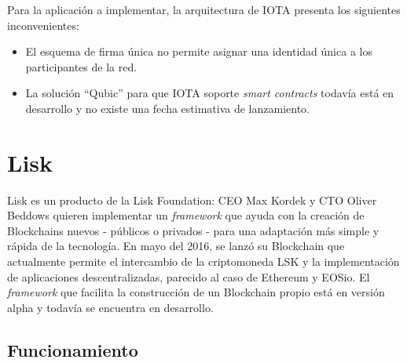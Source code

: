 Para la aplicación a implementar, la arquitectura de IOTA presenta los siguientes inconvenientes:

\begin{itemize}
\item El esquema de firma única no permite asignar una identidad única a los participantes de la red.
\item La solución ``Qubic'' para que IOTA soporte \textit{smart contracts} todavía está en desarrollo y no existe una fecha estimativa de lanzamiento. \cite{qubic_roadmap}
\end{itemize}


\section{Lisk}

Lisk es un producto de la Lisk Foundation: CEO Max Kordek y CTO Oliver Beddows quieren implementar un \textit{framework} que ayuda con la creación de Blockchains nuevos - públicos o privados - para una adaptación más simple y rápida de la tecnología.
En mayo del 2016, se lanzó su Blockchain que actualmente permite el intercambio de la criptomoneda LSK y la implementación de aplicaciones descentralizadas, parecido al caso de Ethereum y EOSio. El \textit{framework} que facilita la construcción de un Blockchain propio está en versión alpha y todavía se encuentra en desarrollo.

\subsection{Funcionamiento}

